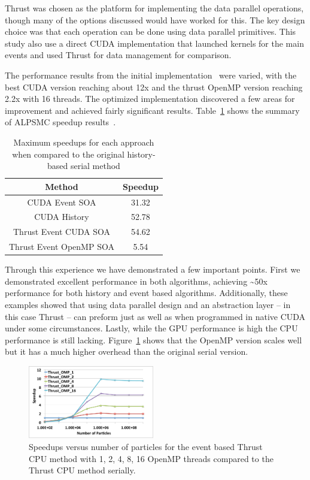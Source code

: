 Thrust was chosen as the platform for implementing the data parallel operations, though many of the options discussed would have worked for this.
%
The key design choice was that each operation can be done using data parallel primitives.
%
This study also use a direct CUDA implementation that launched kernels for the main events and used Thrust for data management for comparison.

The performance results from the initial implementation~\cite{alpsmc1} were varied, with the best CUDA version reaching about 12x and the thrust OpenMP version reaching 2.2x with 16 threads.
%
The optimized implementation discovered a few areas for improvement and achieved fairly significant results.
%
Table~\ref{tab:ALPSspeedup} shows the summary of ALPSMC speedup results~\cite{alpsmc2}.
%

\begin{table}
\caption { Maximum speedups for each approach when compared to the original history-based serial method } \label{tab:ALPSspeedup} 
\begin{center}
\begin{tabular}{ |c|c|}
\hline
Method & Speedup\\
\hline
CUDA Event SOA & 31.32\\
\hline
CUDA History & 52.78\\
\hline
Thrust Event CUDA SOA & 54.62\\
\hline
Thrust Event OpenMP SOA & 5.54\\
\hline
\end{tabular}
\end{center}
\end{table}

Through this experience we have demonstrated a few important points.
%
First we demonstrated excellent performance in both algorithms, achieving \textasciitilde50x performance for both history and event based algorithms.
%
Additionally, these examples showed that using data parallel design and an abstraction layer -- in this case Thrust -- can preform just as well as when programmed in native CUDA under some circumstances. 
%
Lastly, while the GPU performance is high the CPU performance is still lacking.
%
Figure~\ref{fig:OMPScale} shows that the OpenMP version scales well but it has a much higher overhead than the original serial version.

\begin{figure}
\includegraphics[width=0.49\textwidth]{thrustOMPSpeedup.pdf}
\caption{Speedups versus number of particles for the event based Thrust CPU method with 1, 2, 4, 8, 16 OpenMP threads compared to the Thrust CPU method serially.~\cite{alpsmc2}}
\label{fig:OMPScale}
\end{figure}

